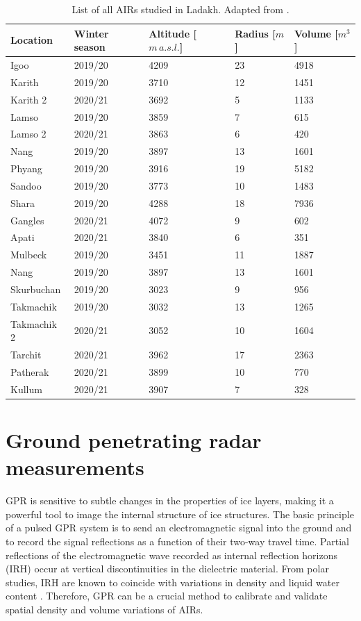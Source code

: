 \begin{table}[htb]
  \centering
  \caption{List of all \ac{AIRs} studied in Ladakh. Adapted from \citet{mariagruberIceStupasLadakh2022}.}
	\label{tab:Ladakh_AIRs}
	\begin{tabular}{|lllll|}
    \hline
    \textbf{Location}     & \textbf{Winter season} & \textbf{Altitude [$m\,a.s.l.$]} & \textbf{
    Radius [$m$]} & \textbf{Volume [$m^3$]} \\ \hline
    Igoo & 2019/20 & 4209 & 23 & 4918  \\
    Karith & 2019/20 & 3710 & 12 & 1451  \\
    Karith 2 & 2020/21 & 3692 & 5 & 1133  \\
    Lamso & 2019/20 & 3859 & 7 & 615  \\
    Lamso 2& 2020/21 & 3863 & 6 & 420  \\
    Nang& 2019/20 & 3897 & 13 & 1601 \\
    Phyang& 2019/20 & 3916 & 19 & 5182 \\
    Sandoo& 2019/20 & 3773 & 10 & 1483 \\
    Shara& 2019/20 & 4288 & 18 & 7936 \\
    Gangles& 2020/21 & 4072 & 9 & 602 \\
    Apati& 2020/21 & 3840 & 6 & 351 \\
    Mulbeck& 2019/20 & 3451 & 11 & 1887\\
    Nang& 2019/20 & 3897 & 13 & 1601\\
    Skurbuchan& 2019/20 & 3023 & 9 & 956\\
    Takmachik& 2019/20 & 3032 & 13 &1265\\
    Takmachik 2& 2020/21 & 3052 & 10 &1604\\
    Tarchit& 2020/21 & 3962 & 17 &2363\\
    Patherak& 2020/21 & 3899 & 10 &770\\
    Kullum& 2020/21 & 3907 & 7 &328\\ \hline
	\end{tabular}
\end{table}


\section{Ground penetrating radar measurements}
\label{sec:gpr}

\ac{GPR} is sensitive to subtle changes in the properties of ice layers,
making it a powerful tool to image the internal structure of ice structures. The basic principle of a pulsed
\ac{GPR} system is to send an electromagnetic signal into the ground and to record the signal reflections as a
function of their two-way travel time. Partial reflections of the electromagnetic wave recorded as internal
reflection horizons (IRH) occur at vertical discontinuities in the dielectric material. From polar studies, IRH
are known to coincide with variations in density and liquid water content \citep{forster2014extensive}.
Therefore, \ac{GPR} can be a crucial method to calibrate and validate spatial density and volume variations of
\ac{AIRs}.

